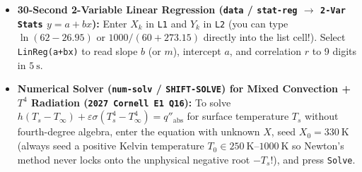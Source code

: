 \begin{itemize}
  \item \textbf{30-Second 2-Variable Linear Regression (\texttt{data} / \texttt{stat-reg} $\to$ \texttt{2-Var Stats} $y = a + bx$):} Enter $X_k$ in \texttt{L1} and $Y_k$ in \texttt{L2} (you can type $\ln(62 - 26.95)$ or $1000/(60 + 273.15)$ directly into the list cell!). Select \texttt{LinReg(a+bx)} to read slope $b$ (or $m$), intercept $a$, and correlation $r$ to 9 digits in $\SI{5}{\second}$.
  \item \textbf{Numerical Solver (\texttt{num-solv} / \texttt{SHIFT-SOLVE}) for Mixed Convection + $T^4$ Radiation (\texttt{2027 Cornell E1 Q16}):} To solve $h(T_s - T_\infty) + \varepsilon\sigma(T_s^4 - T_\infty^4) = q''_{\mathrm{abs}}$ for surface temperature $T_s$ without fourth-degree algebra, enter the equation with unknown $X$, seed $X_0 = \SI{330}{\kelvin}$ (always seed a positive Kelvin temperature $T_0 \in \SIrange{250}{1000}{\kelvin}$ so Newton's method never locks onto the unphysical negative root $-T_s$!), and press \texttt{Solve}.
\end{itemize}

